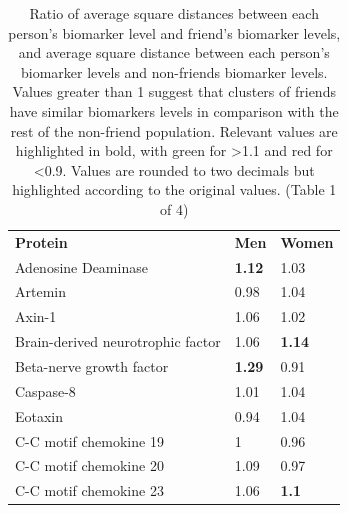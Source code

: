 \begin{table}[ht]
\caption{Ratio of average square distances between each person's biomarker level and friend's biomarker levels, and average square distance between each person's biomarker levels and non-friends biomarker levels. Values greater than 1 suggest that clusters of friends have similar biomarkers levels in comparison with the rest of the non-friend population. Relevant values are highlighted in bold, with green for >1.1 and red for <0.9. Values are rounded to two decimals but highlighted according to the original values. (Table 1 of 4)}
\centering
\renewcommand{\arraystretch}{1.2}
\begin{tabular}{lll}
\rowcolor[HTML]{FFFFC7} 
\textbf{Protein}                                        & \textbf{Men}                         & \textbf{Women}                       \\
Adenosine Deaminase                                     & {\color[HTML]{009901} \textbf{1.12}} & {\color[HTML]{C0C0C0} 1.03}          \\
Artemin                                                 & {\color[HTML]{C0C0C0} 0.98}          & {\color[HTML]{C0C0C0} 1.04}          \\
Axin-1                                                  & {\color[HTML]{C0C0C0} 1.06}          & {\color[HTML]{C0C0C0} 1.02}          \\
Brain-derived neurotrophic factor                       & {\color[HTML]{C0C0C0} 1.06}          & {\color[HTML]{009901} \textbf{1.14}} \\
\rowcolor[HTML]{EFEFEF} 
Beta-nerve growth factor                                & {\color[HTML]{009901} \textbf{1.29}} & {\color[HTML]{C0C0C0} 0.91}          \\
\rowcolor[HTML]{EFEFEF} 
Caspase-8                                               & {\color[HTML]{C0C0C0} 1.01}          & {\color[HTML]{C0C0C0} 1.04}          \\
\rowcolor[HTML]{EFEFEF} 
Eotaxin                                                 & {\color[HTML]{C0C0C0} 0.94}          & {\color[HTML]{C0C0C0} 1.04}          \\
\rowcolor[HTML]{EFEFEF} 
C-C motif chemokine 19                                  & {\color[HTML]{C0C0C0} 1}             & {\color[HTML]{C0C0C0} 0.96}          \\
C-C motif chemokine 20                                  & {\color[HTML]{C0C0C0} 1.09}          & {\color[HTML]{C0C0C0} 0.97}          \\
C-C motif chemokine 23                                  & {\color[HTML]{C0C0C0} 1.06}          & {\color[HTML]{009901} \textbf{1.1}}  \\

\end{tabular}
\end{table}

